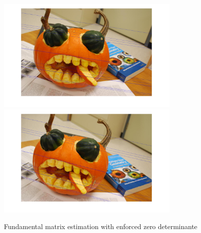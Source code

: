 \documentclass[12pt]{article}
\begin{document}
\begin{figure}[ht]
	\centering
	\includegraphics[width=0.8\textwidth]{Fh1Pumkin.jpg}
	\includegraphics[width=0.8\textwidth]{Fh2Pumkin.jpg}
	\caption{Fundamental matrix estimation with enforced zero determinante}
	\label{fig1}
\end{figure}
\vspace{5mm}
\newline
\end{document}
